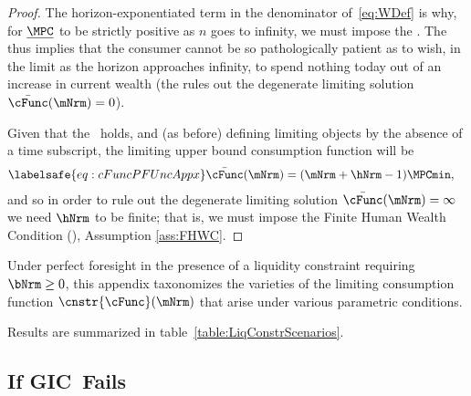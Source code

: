 \documentclass[\econtexRoot/BufferStockTheory]{subfiles}
\begin{document}
\begin{proof}
The horizon-exponentiated term in the denominator of~\eqref{eq:WDef} is why, for $\underline{\MPC}$ to be strictly positive as $n$ goes to infinity, we must impose the {\RIC}.
The {\RIC} thus implies that the consumer cannot be so pathologically patient as to wish, in the limit as the horizon approaches infinity, to spend nothing today out of an increase in current wealth (the {\RIC} rules out the degenerate limiting solution $\bar{\cFunc}(\mNrm)=0$).



\hypertarget{Unconstrained-Solution}{}\hypertarget{PF-Unconstrained-Solution}{}

Given that the {\RIC}~holds, and (as before) defining limiting objects by the absence of a time subscript, the limiting upper bound consumption function will be
\begin{align}\labelsafe{eq:cFuncPFUncAppx}
  \bar{\cFunc}(\mNrm)  & = (\mNrm+\hNrm-1)\MPCmin,
\end{align}
and so in order to rule out the degenerate limiting solution $\bar{\cFunc}(\mNrm) = \infty$ we need $\hNrm$ to be finite; that is, we must impose the Finite Human Wealth Condition ({\FHWC}), Assumption \eqref{ass:FHWC}.

\end{proof}

Under perfect foresight in the presence of a liquidity constraint requiring $\bNrm \geq 0$, this appendix taxonomizes the varieties of the limiting consumption function $\cnstr{\cFunc}(\mNrm)$ that arise under various parametric conditions.



Results are summarized in table~\ref{table:LiqConstrScenarios}.

\subsection{If {GIC}~Fails}
\end{document}
